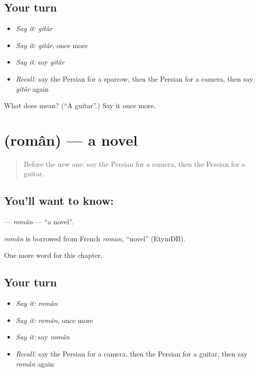 \subsection*{Your turn}
\begin{itemize}
\raggedright
  \item \emph{Say it:} \emph{gitâr}
  \item \emph{Say it:} \emph{gitâr}, once more
  \item \emph{Say it:} say \emph{gitâr}
  \item \emph{Recall:} say the Persian for a sparrow, then the Persian for a camera, then say \emph{gitâr} again
\end{itemize}

\begin{tcolorbox}[breakable,colback=teal!4,colframe=teal!35!black,title={Before you move on}]
What does  mean? (\textquotedblleft{}A guitar\textquotedblright{}.) Say it once more.
\end{tcolorbox}
\section[\texorpdfstring{\fa{رمان} (român)}{رمان (român)}]{ (român) — a novel}

\label{lesson:FA-C172-roman}



\begin{quote}
Before the new one: say the Persian for a camera, then the Persian for a guitar.
\end{quote}

\subsection*{You'll want to know: }
\textbf{} — \emph{român} — \textquotedblleft{}a novel\textquotedblright{}.

\begin{cousinweb}
\emph{român} is borrowed from French \emph{roman}, \textquotedblleft{}novel\textquotedblright{} (EtymDB).
\end{cousinweb}

\begin{grammarlens}[title={What you've built}]
One more word for this chapter.
\end{grammarlens}

\subsection*{Your turn}
\begin{itemize}
\raggedright
  \item \emph{Say it:} \emph{român}
  \item \emph{Say it:} \emph{român}, once more
  \item \emph{Say it:} say \emph{român}
  \item \emph{Recall:} say the Persian for a camera, then the Persian for a guitar, then say \emph{român} again
\end{itemize}

